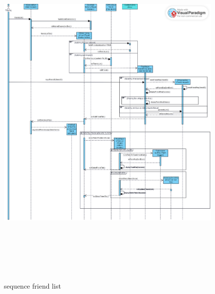 \begin{figure}[!htb]
  \centering
    \centering
    \includegraphics[width=\textwidth,height=18cm]{sequence_friends.png}
    \caption{sequence friend list}
    \label{}
\end{figure}
